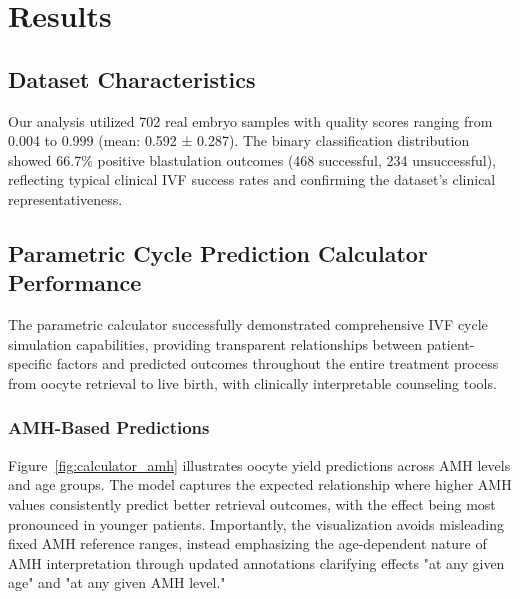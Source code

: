 \section{Results}\label{sec:results}

\subsection{Dataset Characteristics}

Our analysis utilized 702 real embryo samples with quality scores ranging from 0.004 to 0.999 (mean: 0.592 ± 0.287). The binary classification distribution showed 66.7\% positive blastulation outcomes (468 successful, 234 unsuccessful), reflecting typical clinical IVF success rates and confirming the dataset's clinical representativeness.

\subsection{Parametric Cycle Prediction Calculator Performance}

The parametric calculator successfully demonstrated comprehensive IVF cycle simulation capabilities, providing transparent relationships between patient-specific factors and predicted outcomes throughout the entire treatment process from oocyte retrieval to live birth, with clinically interpretable counseling tools.

\subsubsection{AMH-Based Predictions}

Figure~\ref{fig:calculator_amh} illustrates oocyte yield predictions across AMH levels and age groups. The model captures the expected relationship where higher AMH values consistently predict better retrieval outcomes, with the effect being most pronounced in younger patients. Importantly, the visualization avoids misleading fixed AMH reference ranges, instead emphasizing the age-dependent nature of AMH interpretation through updated annotations clarifying effects "at any given age" and "at any given AMH level."

